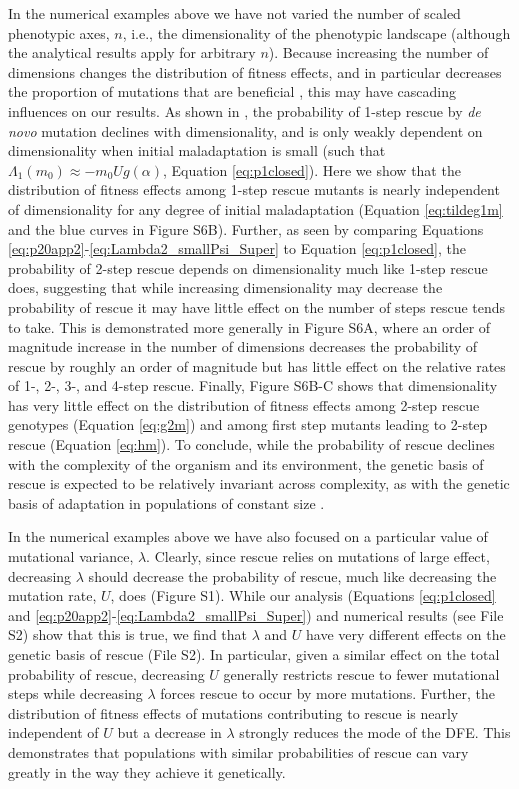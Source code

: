\documentclass[9pt,twocolumn,twoside,lineno]{gsajnl}
\begin{document}
In the numerical examples above we have not varied the number of scaled phenotypic axes, $n$, i.e., the dimensionality of the phenotypic landscape (although the analytical results apply for arbitrary $n$).
Because increasing the number of dimensions changes the distribution of fitness effects, and in particular decreases the proportion of mutations that are beneficial \citep{Fisher1930}, this may have cascading influences on our results.
As shown in \cite{Anciaux2018}, the probability of 1-step rescue by \textit{de novo} mutation declines with dimensionality, and is only weakly dependent on dimensionality when initial maladaptation is small (such that $\Lambda_1(m_0) \approx -m_0 U g(\alpha)$, Equation \ref{eq:p1closed}). 
Here we show that the distribution of fitness effects among 1-step rescue mutants is nearly independent of dimensionality for any degree of initial maladaptation (Equation \ref{eq:tildeg1m} and the blue curves in Figure S6B).
Further, as seen by comparing Equations \ref{eq:p20app2}-\ref{eq:Lambda2_smallPsi_Super} to Equation \ref{eq:p1closed}, the probability of 2-step rescue depends on dimensionality much like 1-step rescue does, suggesting that while increasing dimensionality may decrease the probability of rescue it may have little effect on the number of steps rescue tends to take.
This is demonstrated more generally in Figure S6A, where an order of magnitude increase in the number of dimensions decreases the probability of rescue by roughly an order of magnitude but has little effect on the relative rates of 1-, 2-, 3-, and 4-step rescue.
Finally, Figure S6B-C shows that dimensionality has very little effect on the distribution of fitness effects among 2-step rescue genotypes (Equation \ref{eq:g2m}) and among first step mutants leading to 2-step rescue (Equation \ref{eq:hm}).
To conclude, while the probability of rescue declines with the complexity of the organism and its environment, the genetic basis of rescue is expected to be relatively invariant across complexity, as with the genetic basis of adaptation in populations of constant size \citep[][see also gray curves in Figure S6B,C]{Orr1998}.

In the numerical examples above we have also focused on a particular value of mutational variance, $\lambda$. 
Clearly, since rescue relies on mutations of large effect, decreasing $\lambda$ should decrease the probability of rescue, much like decreasing the mutation rate, $U$, does (Figure S1).
While our analysis (Equations \ref{eq:p1closed} and \ref{eq:p20app2}-\ref{eq:Lambda2_smallPsi_Super}) and numerical results (see File S2) show that this is true, we find that $\lambda$ and $U$ have very different effects on the genetic basis of rescue (File S2).
In particular, given a similar effect on the total probability of rescue, decreasing $U$ generally restricts rescue to fewer mutational steps while decreasing $\lambda$ forces rescue to occur by more mutations.
Further, the distribution of fitness effects of mutations contributing to rescue is nearly independent of $U$ but a decrease in $\lambda$ strongly reduces the mode of the DFE. 
This demonstrates that populations with similar probabilities of rescue can vary greatly in the way they achieve it genetically.
\end{document}
